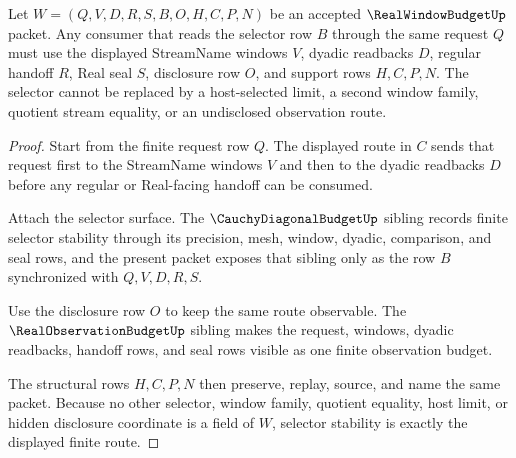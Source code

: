 \begin{theorem}
\label{thm:real-window-budget-selector-stability}
Let $W=(Q,V,D,R,S,B,O,H,C,P,N)$ be an accepted $\RealWindowBudgetUp$ packet. Any consumer that reads the selector row $B$ through the same request $Q$ must use the displayed StreamName windows $V$, dyadic readbacks $D$, regular handoff $R$, Real seal $S$, disclosure row $O$, and support rows $H,C,P,N$. The selector cannot be replaced by a host-selected limit, a second window family, quotient stream equality, or an undisclosed observation route.
\end{theorem}
\begin{proof}
Start from the finite request row $Q$. The displayed route in $C$ sends that request first to the StreamName windows $V$ and then to the dyadic readbacks $D$ before any regular or Real-facing handoff can be consumed.

Attach the selector surface. The $\CauchyDiagonalBudgetUp$ sibling records finite selector stability through its precision, mesh, window, dyadic, comparison, and seal rows, and the present packet exposes that sibling only as the row $B$ synchronized with $Q,V,D,R,S$.

Use the disclosure row $O$ to keep the same route observable. The $\RealObservationBudgetUp$ sibling makes the request, windows, dyadic readbacks, handoff rows, and seal rows visible as one finite observation budget.

The structural rows $H,C,P,N$ then preserve, replay, source, and name the same packet. Because no other selector, window family, quotient equality, host limit, or hidden disclosure coordinate is a field of $W$, selector stability is exactly the displayed finite route.
\end{proof}

